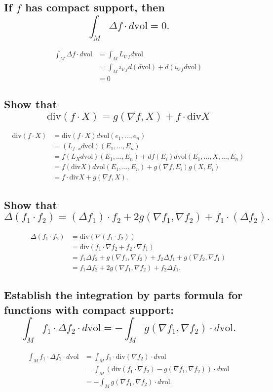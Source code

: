 \documentclass[10pt]{article}
\newcommand{\vol}{{\mbox{vol}} }
\renewcommand{\div}{\mbox{div} }
\begin{document}
\subsection{If $f$ has compact support, then $$\int_M \Delta f \cdot d\vol =0.$$}
 \begin{align*}\int_M \Delta f \cdot d\vol &= \int_M L_{\nabla f} d \vol \\ &= \int_M i_{\nabla f} d(d \vol) + d(i_{\nabla f} d \vol) \\ &=0\end{align*}
\subsection{Show that $$\div (f \cdot X) = g(\nabla f, X) + f \cdot \div X$$}
\begin{align*} \div (f \cdot X) &= \div(f \cdot X) d \vol (e_1, \dots, e_n) \\ &= (L_{f \cdot x} d \vol ) (E_1 , \dots, E_n) \\ &= f(L_X d \vol)(E_1, \dots, E_n) + df (E_i) d \vol (E_1, \dots, X, \dots, E_n) \\ &= f(\div X) d \vol(E_1, \dots, E_n) + g(\nabla f, E_i)g(X,E_i) \\ &= f \cdot \div X + g(\nabla f, X). \end{align*}
\subsection{Show that $$\Delta (f_1 \cdot f_2) = ( \Delta f_1) \cdot f_2 + 2 g (\nabla f_1, \nabla f_2) + f_1 \cdot (\Delta f_2).$$}
\begin{align*} \Delta(f_1 \cdot f_2) &= \div(\nabla( f_1 \cdot f_2)) \\ &= \div(f_1 \cdot \nabla f_2 + f_2 \cdot \nabla f_1) \\ &= f_1 \Delta f_2 + g( \nabla f_1, \nabla f_2) + f_2 \Delta f_1 + g(\nabla f_2, \nabla f_1) \\ &= f_1 \Delta f_2 + 2 g( \nabla f_1, \nabla f_2) + f_2 \Delta f_1. \end{align*}
\subsection{Establish the integration by parts formula for functions with compact support: $$\int_M f_1 \cdot \Delta f_2 \cdot d \vol = - \int_M g(\nabla f_1, \nabla f_2 ) \cdot d \vol.$$}
\begin{align*} \int_M f_1 \cdot \Delta f_2 \cdot d \vol &= \int_M f_1 \cdot \div (\nabla f_2 ) \cdot d \vol \\ &= \int_M(\div(f_1 \cdot \nabla f_2) - g(\nabla f_1, \nabla f_2)) \cdot d \vol \\ &= - \int_M g(\nabla f_1 , \nabla f_2) \cdot d \vol.\end{align*}
\end{document}
